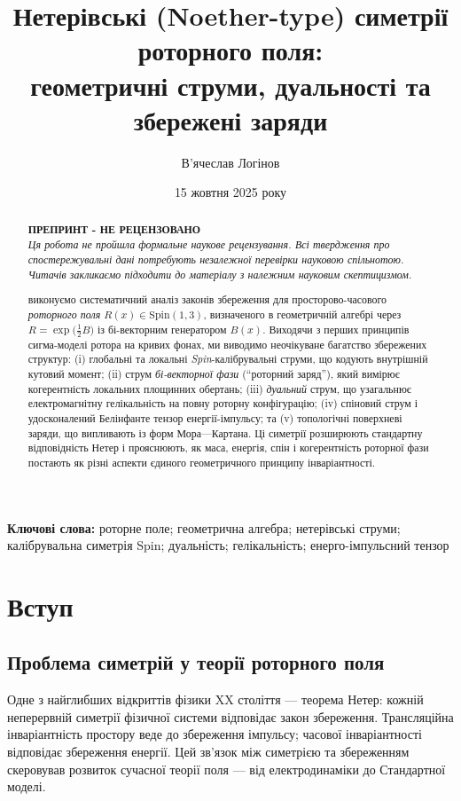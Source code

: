 \documentclass[11pt,a4paper]{article}
\title{Нетерівські (Noether-type) симетрії роторного поля:\\
геометричні струми, дуальності та збережені заряди}
\author[1]{В'ячеслав Логінов}
\affil[1]{Київ, Україна\\ \texttt{barthez.slavik@gmail.com}}
\date{15 жовтня 2025 року}
\numberwithin{equation}{section}
\theoremstyle{plain}
\theoremstyle{definition}
\theoremstyle{remark}
\newcommand{\keywords}{\textbf{Ключові слова:} роторне поле; геометрична алгебра; нетерівські струми; калібрувальна симетрія Spin; дуальність; гелікальність; енерго-імпульсний тензор}
\begin{document}
\maketitle

\begin{abstract}
\noindent
\textbf{ПРЕПРИНТ - НЕ РЕЦЕНЗОВАНО}\\
\textit{Ця робота не пройшла формальне наукове рецензування. Всі твердження про спостережувальні дані потребують незалежної перевірки науковою спільнотою. Читачів закликаємо підходити до матеріалу з належним науковим скептицизмом.}

\medskip
{} виконуємо систематичний аналіз законів збереження для просторово-часового \emph{роторного поля} $R(x)\in \mathrm{Spin}(1,3)$, визначеного в геометричній алгебрі через $R=\exp\!\big(\tfrac{1}{2}B\big)$ із бі-векторним генератором $B(x)$. Виходячи з перших принципів сигма-моделі ротора на кривих фонах, ми виводимо неочікуване багатство збережених структур: (i) глобальні та локальні \emph{Spin}-калібрувальні струми, що кодують внутрішній кутовий момент; (ii) струм \emph{бі-векторної фази} (``роторний заряд''), який вимірює когерентність локальних площинних обертань; (iii) \emph{дуальний} струм, що узагальнює електромагнітну гелікальність на повну роторну конфігурацію; (iv) спіновий струм і удосконалений Белінфанте тензор енергії-імпульсу; та (v) топологічні поверхневі заряди, що випливають із форм Мора—Картана. Ці симетрії розширюють стандартну відповідність Нетер і прояснюють, як маса, енергія, спін і когерентність роторної фази постають як різні аспекти єдиного геометричного принципу інваріантності.
\end{abstract}

\keywords

\section{Вступ}
\label{sec:intro}

\subsection{Проблема симетрій у теорії роторного поля}

Одне з найглибших відкриттів фізики XX століття — теорема Нетер: кожній неперервній симетрії фізичної системи відповідає закон збереження. Трансляційна інваріантність простору веде до збереження імпульсу; часової інваріантності відповідає збереження енергії. Цей зв’язок між симетрією та збереженням скеровував розвиток сучасної теорії поля — від електродинаміки до Стандартної моделі.
\end{document}
